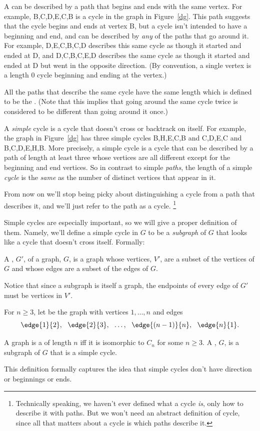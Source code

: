 A \emph{} can be described by a path that begins and ends with the same vertex.  For example,
B,C,D,E,C,B is a cycle in the graph in Figure~\ref{dg}.  This path
suggests that the cycle begins and ends at vertex B, but a cycle isn't
intended to have a beginning and end, and can be described by \emph{any}
of the paths that go around it.  For example, D,E,C,B,C,D describes this
same cycle as though it started and ended at D, and D,C,B,C,E,D describes
the same cycle as though it started and ended at D but went in the
opposite direction.  (By convention, a single vertex is a length 0 cycle
beginning and ending at the vertex.)

All the paths that describe the same cycle have the same length which is defined to
be the .  (Note that this implies that going around the
same cycle twice is considered to be different than going around it once.)

A \emph{simple} cycle is a cycle that doesn't cross or
backtrack on itself.  For example, the graph in Figure~\ref{dg} has three
simple cycles B,H,E,C,B and C,D,E,C and B,C,D,E,H,B.  More precisely, a
simple cycle is a cycle that can be described by a path of length at least
three whose vertices are all different except for the beginning and end
vertices.  So in contrast to simple \emph{paths}, the length of a simple
\emph{cycle} is the \emph{same} as the number of distinct vertices that
appear in it.

From now on we'll stop being picky about distinguishing a cycle from a
path that describes it, and we'll just refer to the path as a cycle.
\footnote{Technically speaking, we haven't ever defined what a cycle
\emph{is}, only how to describe it with paths.  But we won't need an
abstract definition of cycle, since all that matters about a cycle is which
paths describe it.}

Simple cycles are especially important, so we will give a proper
definition of them.  Namely, we'll define a simple cycle in $G$ to be a
\emph{subgraph} of $G$ that looks like a cycle that doesn't cross itself.
Formally:
\begin{definition}
A , $G'$, of a graph, $G$, is a graph whose vertices, $V'$,
are a subset of the vertices of $G$ and whose edges are a subset
of the edges of $G$.
\end{definition}
Notice that since a subgraph is itself a graph, the endpoints of every
edge of $G'$ must be vertices in $V'$.
\begin{definition}
  For $n \ge 3$, let  be the graph with vertices $1,\dots, n$
  and edges
\[
\edge{1}{2},\ \ \edge{2}{3},\ \ \dots,\ \ \edge{(n-1)}{n},\ \ \edge{n}{1}.
\]

A graph is a  of length $n$ iff it is isomorphic to $C_n$
for some $n \ge 3$.  A , $G$, is a subgraph
of $G$ that is a simple cycle.
\end{definition}
This definition formally captures the idea that simple cycles don't
have direction or beginnings or ends.


